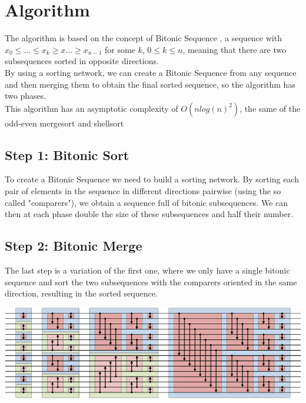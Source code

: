 \documentclass[a4paper, 12pt, oneside]{article}
\begin{document}
\section{Algorithm}

The algorithm is based on the concept of Bitonic Sequence \cite{bitonic}, a sequence with $x_0 \leq ... \leq x_k \geq x ... \geq x_{n-1}$ for some $k$, $0 \leq k \le n$, meaning that there are two subsequences sorted in opposite directions.\\
By using a sorting network, we can create a Bitonic Sequence from any sequence and then merging them to obtain the final sorted sequence, so the algorithm has two phases.\\
This algorithm has an asymptotic complexity of $O(nlog(n)^2)$, the same of the odd-even mergesort \cite{oddeven} and shellsort \cite{shellsort}


\subsection{Step 1: Bitonic Sort}

To create a Bitonic Sequence we need to build a sorting network. By sorting each pair of elements in the sequence in different directions pairwise (using the so called "comparers"), we obtain a sequence full of bitonic subsequences. We can then at each phase double the size of these subsequences and half their number.\\

\subsection{Step 2: Bitonic Merge}

The last step is a variation of the first one, where we only have a single bitonic sequence and sort the two subsequences with the comparers oriented in the same direction, resulting in the sorted sequence.

\begin{center}
  \includegraphics{images/bitonic.png}
\end{center}
\end{document}
